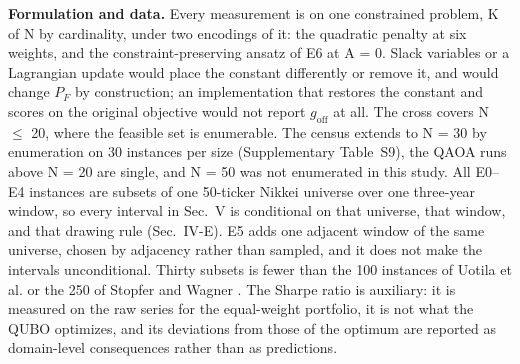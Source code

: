 \documentclass[journal]{IEEEtran}
\begin{document}
\textbf{Formulation and data.} Every measurement is on one constrained problem, K of N by cardinality, under two encodings of it: the quadratic penalty at six weights, and the constraint-preserving ansatz of E6 at A = 0. Slack variables or a Lagrangian update would place the constant differently or remove it, and would change $P_{F}$ by construction; an implementation that restores the constant and scores on the original objective would not report $g_{\mathrm{off}}$ at all. The cross covers N $\leq$ 20, where the feasible set is enumerable. The census extends to N = 30 by enumeration on 30 instances per size (Supplementary Table~S9), the QAOA runs above N = 20 are single, and N = 50 was not enumerated in this study. All E0--E4 instances are subsets of one 50-ticker Nikkei universe over one three-year window, so every interval in Sec.~V is conditional on that universe, that window, and that drawing rule (Sec.~IV-E). E5 adds one adjacent window of the same universe, chosen by adjacency rather than sampled, and it does not make the intervals unconditional. Thirty subsets is fewer than the 100 instances of Uotila et al. \cite{ref18} or the 250 of Stopfer and Wagner \cite{ref13}. The Sharpe ratio is auxiliary: it is measured on the raw series for the equal-weight portfolio, it is not what the QUBO optimizes, and its deviations from those of the optimum are reported as domain-level consequences rather than as predictions.
\end{document}
